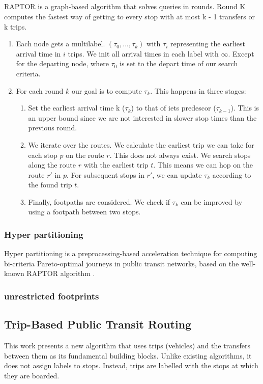 \subsection{}
RAPTOR is a graph-based algorithm that solves queries in rounds. Round K computes the fastest way of getting to every stop with at most k - 1 transfers or k trips.

\begin{enumerate}
    \item Each node gets a multilabel. $(\tau_0,...,\tau_k)$ with $\tau_i$ representing the earliest arrival time in $i$ trips. We init all arrival times in each label with $\infty$. Except for the departing node, where $\tau_0$ is set to the depart time of our search criteria.
    \item For each round $k$ our goal is to compute $\tau_k$. This happens in three stages:\begin{enumerate}
        \item Set the earliest arrival time k ($\tau_k$) to that of iets predescor ($\tau_{k-1}$). This is an upper bound since we are not interested in slower stop times than the previous round.
        \item We iterate over the routes. We calculate the earliest trip we can take for each stop $p$ on the route $r$. This does not always exist. We search stops along the route $r$ with the earliest trip $t$. This means we can hop on the route $r'$ in $p$. For subsequent stops in $r'$, we can update $\tau_k$ according to the found trip $t$.
        \item Finally, footpaths are considered. We check if $\tau_k$ can be improved by using a footpath between two stops. 
    \end{enumerate}
\end{enumerate}

\subsubsection{Hyper partitioning}
Hyper partitioning is a preprocessing-based acceleration technique for computing bi-criteria Pareto-optimal journeys in public transit networks, based on the well-known RAPTOR algorithm \cite{delling_round-based_2015}.
\subsubsection{unrestricted footprints}
\subsection{Trip-Based Public Transit Routing}
This work presents a new algorithm that uses trips (vehicles) and the transfers between them as its fundamental building blocks. Unlike existing algorithms, it does not assign labels to stops. Instead, trips are labelled with the stops at which they are boarded.
